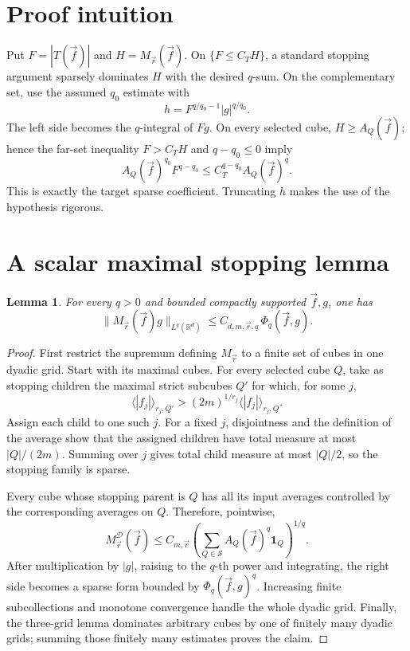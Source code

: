 \documentclass[11pt]{article}
\newtheorem{lemma}{Lemma}
\newcommand{\R}{\mathbb R}
\newcommand{\1}{\mathbf 1}
\newcommand{\avg}[3]{\langle #1\rangle_{#2,#3}}
\newcommand{\Aq}[2]{A_{#1}(#2)}
\newcommand{\Mvec}{M_{\vec r}}
\begin{document}
\section{Proof intuition}

Put $F=|T(\vec f)|$ and $H=\Mvec(\vec f)$. On
$\{F\le C_T H\}$, a standard stopping argument sparsely dominates $H$ with
the desired $q$-sum. On the complementary set, use the assumed $q_0$ estimate
with
\[
 h=F^{q/q_0-1}|g|^{q/q_0}.
\]
The left side becomes the $q$-integral of $Fg$. On every selected cube,
$H\ge \Aq{Q}{\vec f}$; hence the far-set inequality
$F>C_T H$ and $q-q_0\le0$ imply
\[
 \Aq{Q}{\vec f}^{q_0}F^{q-q_0}
 \le C_T^{q-q_0}\Aq{Q}{\vec f}^{q}.
\]
This is exactly the target sparse coefficient. Truncating $h$ makes the use
of the hypothesis rigorous.

\section{A scalar maximal stopping lemma}

\begin{lemma}\label{lem:maximal}
For every $q>0$ and bounded compactly supported $\vec f,g$, one has
\[
 \|\Mvec(\vec f)g\|_{L^q(\R^d)}
 \le C_{d,m,\vec r,q}\,\Phi_q(\vec f,g).
\]
\end{lemma}

\begin{proof}
First restrict the supremum defining $\Mvec$ to a finite set of cubes in one
dyadic grid. Start with its maximal cubes. For every selected cube $Q$, take
as stopping children the maximal strict subcubes $Q'$ for which, for some
$j$,
\[
 \avg{|f_j|}{r_j}{Q'}>(2m)^{1/r_j}\avg{|f_j|}{r_j}{Q}.
\]
Assign each child to one such $j$. For a fixed $j$, disjointness and the
definition of the average show that the assigned children have total measure
at most $|Q|/(2m)$. Summing over $j$ gives total child measure at most
$|Q|/2$, so the stopping family is sparse.

Every cube whose stopping parent is $Q$ has all its input averages controlled
by the corresponding averages on $Q$. Therefore, pointwise,
\[
 M^{\mathcal D}_{\vec r}(\vec f)
 \le C_{m,\vec r}
 \left(\sum_{Q\in\mathcal S}\Aq{Q}{\vec f}^{q}\1_Q\right)^{1/q}.
\]
After multiplication by $|g|$, raising to the $q$-th power and integrating,
the right side becomes a sparse form bounded by $\Phi_q(\vec f,g)^q$.
Increasing finite subcollections and monotone convergence handle the whole
dyadic grid. Finally, the three-grid lemma dominates arbitrary cubes by one
of finitely many dyadic grids; summing those finitely many estimates proves
the claim.
\end{proof}
\end{document}
